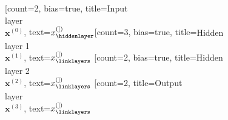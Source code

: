 \documentclass{standalone}
\begin{document}
    \begin{neuralnetwork}[height=5, nodespacing=10mm, layerspacing=20mm]
        \newcommand{\x}[2]{$x^{(#1)}_#2$}
        [count=2, bias=true, title=\scriptsize{Input\\layer\\$\mathbf{x}^{(0)}$}, text=\x]
        \hiddenlayer[count=3, bias=true, title=\scriptsize{Hidden\\layer 1\\$\mathbf{x}^{(1)}$}, text=\x] \linklayers
        \hiddenlayer[count=2, bias=true, title=\scriptsize{Hidden\\layer 2\\$\mathbf{x}^{(2)}$}, text=\x] \linklayers
        \outputlayer[count=2, title=\scriptsize{Output\\layer\\$\mathbf{x}^{(3)}$}, text=\x] \linklayers
    \end{neuralnetwork}
\end{document}
